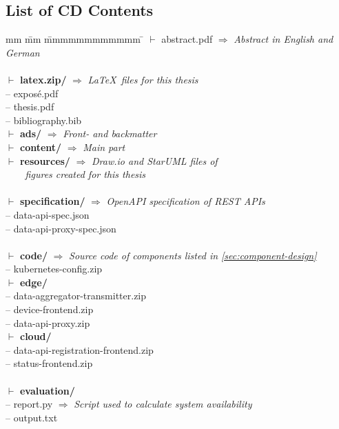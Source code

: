 \begin{appendices}

\FloatBarrier


\chapter{List of CD Contents}
\label{app:cd-contents}

\begin{tabbing}
	mm \= mm \= mmmmmmmmmmmm \= \kill
	$\vdash$ abstract.pdf 						\> \> \> $\Rightarrow$ \textit{Abstract in English and German} \\
	\\
	$\vdash$ \textbf{latex.zip/} 				\> \> \> $\Rightarrow$ \textit{\LaTeX~files for this thesis} \\
	\> -- exposé.pdf \\
	\> -- thesis.pdf \\
	\> -- bibliography.bib \\
	\> $\vdash$ \textbf{ads/}   			\> \> $\Rightarrow$ \textit{Front- and backmatter} \\
	\> $\vdash$ \textbf{content/}   		\> \> $\Rightarrow$ \textit{Main part} \\
	\> $\vdash$ \textbf{resources/}   		\> \> $\Rightarrow$ \textit{Draw.io and StarUML files of} \\
											\> \> \> 			\textit{~~~~figures created for this thesis} \\
	\\
	$\vdash$ \textbf{specification/} 		\> \> \> $\Rightarrow$ \textit{OpenAPI specification of \acs{REST} \acsp{API}} \\
	\> -- data-api-spec.json \\
	\> -- data-api-proxy-spec.json \\
	\\
	$\vdash$ \textbf{code/} 				\> \> \> $\Rightarrow$ \textit{Source code of components listed in \autoref{sec:component-design}} \\
	\> -- kubernetes-config.zip \\
	\> $\vdash$ \textbf{edge/} \\
	\> \> -- data-aggregator-transmitter.zip \\
	\> \> -- device-frontend.zip \\
	\> \> -- data-api-proxy.zip \\
	\> $\vdash$ \textbf{cloud/} \\
	\> \> -- data-api-registration-frontend.zip \\
	\> \> -- status-frontend.zip \\
	\\
	$\vdash$ \textbf{evaluation/} \\
	\> -- report.py 						\> \> $\Rightarrow$ \textit{Script used to calculate system availability} \\
	\> -- output.txt \\
\end{tabbing}

\end{appendices}
